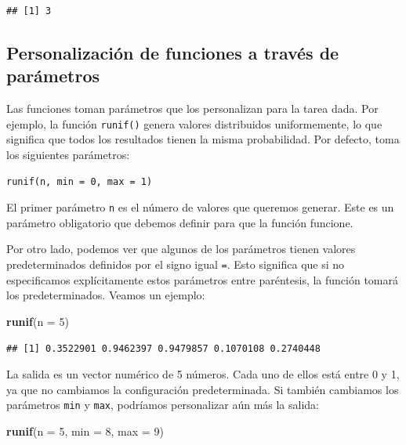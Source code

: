 \documentclass[
]{book}
\newenvironment{Shaded}{\begin{snugshade}}{\end{snugshade}}
\newcommand{\DataTypeTok}[1]{\textcolor[rgb]{0.13,0.29,0.53}{#1}}
\newcommand{\DecValTok}[1]{\textcolor[rgb]{0.00,0.00,0.81}{#1}}
\newcommand{\KeywordTok}[1]{\textcolor[rgb]{0.13,0.29,0.53}{\textbf{#1}}}
\newcommand{\NormalTok}[1]{#1}
\begin{document}
\begin{verbatim}
## [1] 3
\end{verbatim}

\hypertarget{personalizaciuxf3n-de-funciones-a-travuxe9s-de-paruxe1metros}{%
\subsection{Personalización de funciones a través de parámetros}\label{personalizaciuxf3n-de-funciones-a-travuxe9s-de-paruxe1metros}}

Las funciones toman parámetros que los personalizan para la tarea dada. Por ejemplo, la función \texttt{runif()} genera valores distribuidos uniformemente, lo que significa que todos los resultados tienen la misma probabilidad. Por defecto, toma los siguientes parámetros:

\begin{verbatim}
runif(n, min = 0, max = 1)
\end{verbatim}

El primer parámetro \texttt{n} es el número de valores que queremos generar. Este es un parámetro obligatorio que debemos definir para que la función funcione.

Por otro lado, podemos ver que algunos de los parámetros tienen valores predeterminados definidos por el signo igual \texttt{=}. Esto significa que si no especificamos explícitamente estos parámetros entre paréntesis, la función tomará los predeterminados. Veamos un ejemplo:

\begin{Shaded}
\begin{Highlighting}[]
\KeywordTok{runif}\NormalTok{(}\DataTypeTok{n =} \DecValTok{5}\NormalTok{)}
\end{Highlighting}
\end{Shaded}

\begin{verbatim}
## [1] 0.3522901 0.9462397 0.9479857 0.1070108 0.2740448
\end{verbatim}

La salida es un vector numérico de 5 números. Cada uno de ellos está entre 0 y 1, ya que no cambiamos la configuración predeterminada. Si también cambiamos los parámetros \texttt{min} y \texttt{max}, podríamos personalizar aún más la salida:

\begin{Shaded}
\begin{Highlighting}[]
\KeywordTok{runif}\NormalTok{(}\DataTypeTok{n =} \DecValTok{5}\NormalTok{, }\DataTypeTok{min =} \DecValTok{8}\NormalTok{, }\DataTypeTok{max =} \DecValTok{9}\NormalTok{)}
\end{Highlighting}
\end{Shaded}
\end{document}
